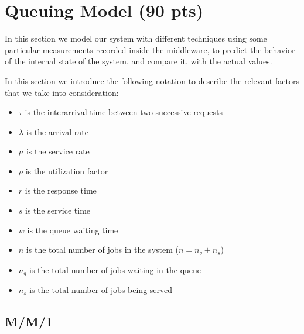 \documentclass[11pt,a4paper]{article}
\begin{document}
\newpage
\section{Queuing Model (90 pts)}

In this section we model our system with different techniques using some particular measurements recorded inside the middleware, to predict the behavior of the internal state of the system, and compare it, with the actual values.

In this section we introduce the following notation to describe the relevant factors that we take into consideration:

\begin{itemize}
    \item $\tau$ is the interarrival time between two successive requests
    \item $\lambda$ is the arrival rate
    \item $\mu$ is the service rate
    \item $\rho$ is the utilization factor
    \item $r$ is the response time
    \item $s$ is the service time
    \item $w$ is the queue waiting time
    \item $n$ is the total number of jobs in the system ($n = n_q + n_s$)
    \item $n_q$ is the total number of jobs waiting in the queue
    \item $n_s$ is the total number of jobs being served
\end{itemize}

\subsection{M/M/1}
\end{document}
